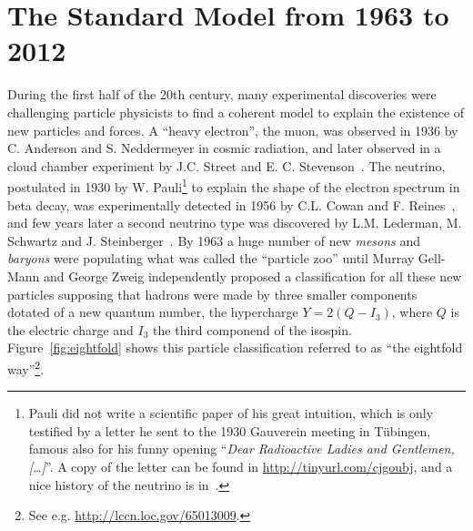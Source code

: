 

\section{The Standard Model from 1963 to 2012}\label{sec:THsm}




During the first half of the 20th century, many experimental 
discoveries were challenging particle physicists to find a 
coherent model to explain the existence of new particles and 
forces. A ``heavy electron'', the muon, was observed in 1936 
by C.%
 Anderson and S.%
 Neddermeyer in cosmic radiation, and later
observed in a cloud chamber experiment by %
J.C. Street and E. C. Stevenson~\cite{PhysRev.52.1003}. 
The neutrino, postulated in 1930 by %
W. Pauli\footnote{Pauli did not write a scientific
paper of his great intuition, which is only testified 
by a letter he sent to the 1930 Gauverein meeting in T\"ubingen,
famous also for his funny opening 
``{\it Dear Radioactive Ladies and Gentlemen,[\dots]}''. A copy
of the letter can be found in \url{http://tinyurl.com/cjgoubj}, 
and a nice history of the neutrino is in~\cite{2006physics...3106P}.}
to explain the shape of the electron 
spectrum in beta decay, was experimentally 
detected in 1956 by %
C.L. Cowan and %
F. Reines~\cite{1956Sci...124..103C}, and few years later a 
second neutrino type was discovered by %
L.M. Lederman, %
M. Schwartz and %
J. Steinberger~\cite{1962PhRvL...9...36D}. 
By 1963 a huge number of new {\it mesons} and {\it baryons} 
were populating what was called the ``particle zoo'' 
until Murray Gell-Mann and George Zweig independently proposed 
a classification for all these new particles 
supposing that hadrons were made by three smaller 
components~\cite{GellMann1964214,Zweig:352337} dotated of a new
quantum number, the hypercharge $Y=2(Q-I_3)$, where $Q$ is the electric
charge and $I_3$ the third componend of the isospin.
Figure~\ref{fig:eightfold} shows this particle classification referred to as 
``the eightfold way''\footnote{See e.g. \url{http://lccn.loc.gov/65013009}.}. 

